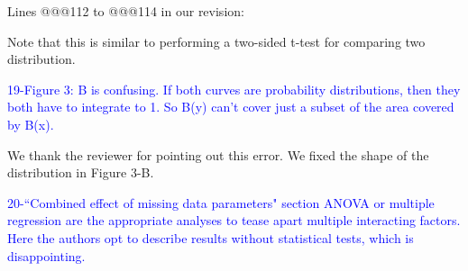 \documentclass[11pt]{letter}
\begin{document}
\begin{letter}{}
Lines @@@112 to @@@114 in our revision:

\hfill\begin{minipage}{\dimexpr\textwidth-1cm}
Note that this is similar to performing a two-sided t-test for comparing two distribution.
\end{minipage}


\textcolor{blue}{19-Figure 3: B is confusing. If both curves are probability distributions, then they both have to integrate to 1. So B(y) can't cover just a subset of the area covered by B(x).}

We thank the reviewer for pointing out this error. We fixed the shape of the distribution in Figure 3-B.


\textcolor{blue}{20-``Combined effect of missing data parameters" section ANOVA or multiple regression are the appropriate analyses to tease apart multiple interacting factors. Here the authors opt to describe results without statistical tests, which is disappointing.}


\end{letter}
\end{document}
